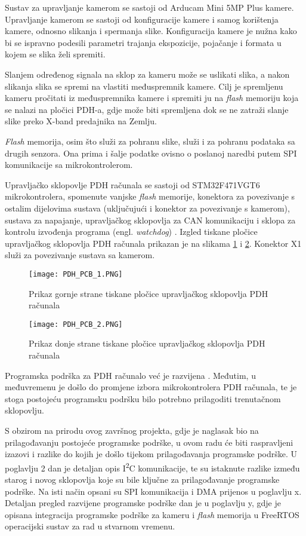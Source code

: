 Sustav za upravljanje kamerom se sastoji od Arducam Mini 5MP Plus kamere. Upravljanje kamerom se sastoji od konfiguracije kamere i samog korištenja kamere, odnosno slikanja i spermanja slike. Konfiguracija kamere je nužna kako bi se ispravno podesili parametri trajanja ekspozicije, pojačanje i formata u kojem se slika želi spremiti.

Slanjem određenog signala na sklop za kameru može se uslikati slika, a nakon slikanja slika se spremi na vlastiti međuspremnik kamere. Cilj je spremljenu kameru pročitati iz međuspremnika kamere i spremiti ju na \textit{flash} memoriju koja se nalazi na pločici PDH-a, gdje može biti spremljena dok se ne zatraži slanje slike preko X-band predajnika na Zemlju.

\textit{Flash} memorija, osim što služi za pohranu slike, služi i za pohranu podataka sa drugih senzora. Ona prima i šalje podatke ovisno o poslanoj naredbi putem SPI komunikacije sa mikrokontrolerom.

Upravljačko sklopovlje PDH računala se sastoji od STM32F471VGT6 mikrokontrolera, spomenute vanjske \textit{flash} memorije, konektora za povezivanje s ostalim dijelovima sustava (uključujući i konektor za povezivanje s kamerom), sustava za napajanje, upravljačkog sklopovlja za CAN komunikaciju i sklopa za kontrolu izvođenja programa (engl. \textit{watchdog}) \cite{zavrsni_filip_juric}. Izgled tiskane pločice upravljačkog sklopovlja PDH računala prikazan je na slikama \ref{fig:PDH_PCB_1} i \ref{fig:PDH_PCB_2}. Konektor X1 služi za povezivanje sustava sa kamerom.

\begin{figure}[H]
	\centering
	\texttt{[image: PDH\_PCB\_1.PNG]}
	\caption{Prikaz gornje strane tiskane pločice upravljačkog sklopovlja PDH računala \cite{zavrsni_filip_juric}}
	\label{fig:PDH_PCB_1}
\end{figure}

\begin{figure}[H]
	\centering
	\texttt{[image: PDH\_PCB\_2.PNG]}
	\caption{Prikaz donje strane tiskane pločice upravljačkog sklopovlja PDH računala \cite{zavrsni_filip_juric}}
	\label{fig:PDH_PCB_2}
\end{figure}

Programska podrška za PDH računalo već je razvijena \cite{diplomski_goran_petrak}. Međutim, u međuvremenu je došlo do promjene izbora mikrokontrolera PDH računala, te je stoga postojeću programsku podršku bilo potrebno prilagoditi trenutačnom sklopovlju.

S obzirom na prirodu ovog završnog projekta, gdje je naglasak bio na prilagođavanju postojeće programske podrške, u ovom radu će biti raspravljeni izazovi i razlike do kojih je došlo tijekom prilagođavanja programske podrške. U poglavlju 2 dan je detaljan opis I\textsuperscript{2}C komunikacije, te su istaknute razlike između starog i novog sklopovlja koje su bile ključne za prilagođavanje programske podrške. Na isti način opsani su SPI komunikacija i DMA prijenos u poglavlju x. Detaljan pregled razvijene programske podrške dan je u poglavlju y, gdje je opisana integracija programske podrške za kameru i \textit{flash} memorija u FreeRTOS operacijski sustav za rad u stvarnom vremenu.